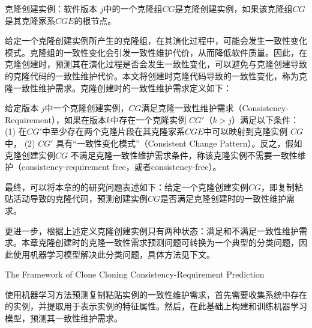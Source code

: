 \begin{definition} 
\label{def-cloninginstance}
克隆创建实例：软件版本 $j$中的一个克隆组$CG$是克隆创建实例，如果该克隆组$CG$是其克隆家系$CGE$的根节点。
\end{definition}



给定一个克隆创建实例所产生的克隆组，在其演化过程中，可能会发生一致性变化模式。克隆组的一致性变化会引发一致性维护代价，从而降低软件质量。因此，在克隆创建时，预测其在演化过程是否会发生一致性变化，可以避免与克隆创建导致的克隆代码的一致性维护代价。本文将创建时克隆代码导致的一致性变化，称为克隆一致性维护需求。克隆创建时的一致性维护需求定义如下：

\begin{definition} 
 \label{def-cloningconsistency}
给定版本 $j$中一个克隆创建实例，$CG$满足克隆一致性维护需求（Consistency-Requirement），如果在版本$k$中存在一个克隆实例 $CG'$（$k>j$）满足以下条件： (1) 在$CG'$中至少存在两个克隆片段在其克隆家系$CGE$中可以映射到克隆实例 $CG$中， (2) $CG'$ 具有“一致性变化模式”（Consistent Change Pattern）。反之，假如克隆创建实例$CG$ 不满足克隆一致性维护需求条件，称该克隆实例不需要一致性维护（consistency-requirement free，或者consistency-free）。
\end{definition}


最终，可以将本章的的研究问题表述如下：给定一个克隆创建实例$CG$，即复制粘贴活动导致的克隆代码，预测创建实例$CG$是否满足克隆创建时的一致性维护需求。

更进一步，根据上述定义克隆创建实例只有两种状态：满足和不满足一致性维护需求。本章克隆创建时的克隆一致性需求预测问题可转换为一个典型的分类问题，因此使用机器学习模型解决此分类问题，具体方法见下文。

{The Framework of Clone Cloning Consistency-Requirement Prediction }

使用机器学习方法预测复制粘贴实例的一致性维护需求，首先需要收集系统中存在的实例，并提取用于表示实例的特征属性。然后，在此基础上构建和训练机器学习模型，预测其一致性维护需求。


